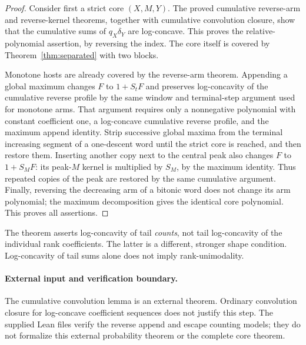 \begin{proof}
Consider first a strict core $(X,M,Y)$. The proved cumulative reverse-arm and reverse-kernel
theorems, together with cumulative convolution closure, show that the
cumulative sums of $q_X\delta_Y$ are log-concave. This proves the
relative-polynomial assertion, by reversing the index.
The core itself is covered by Theorem~\ref{thm:separated} with two
blocks.

Monotone hosts are already covered by the reverse-arm theorem.
Appending a global maximum changes $F$ to $1+S_tF$ and preserves
log-concavity of the cumulative reverse profile by the same window and
terminal-step argument used for monotone arms. That argument requires
only a nonnegative polynomial with constant coefficient one, a
log-concave cumulative reverse profile, and the maximum append identity.
Strip successive global maxima from the terminal increasing segment of
a one-descent word until the strict core is reached, and then restore
them. Inserting another copy next to the central peak also changes
$F$ to $1+S_MF$: its peak-$M$ kernel is multiplied by $S_M$, by the
maximum identity. Thus repeated copies of the peak are restored by
the same cumulative argument.
Finally, reversing the decreasing arm of a bitonic word does not change
its arm polynomial; the maximum decomposition gives the identical
core polynomial. This proves all assertions.
\end{proof}

The theorem asserts log-concavity of tail \emph{counts}, not tail
log-concavity of the individual rank coefficients. The latter is a
different, stronger shape condition. Log-concavity of tail sums alone
does not imply rank-unimodality.

\paragraph{External input and verification boundary.}
The cumulative convolution lemma is an external theorem. Ordinary
convolution closure for log-concave coefficient sequences does not
justify this step. The supplied Lean files verify the reverse append
and escape counting models; they do not formalize this external
probability theorem or the complete core theorem.
